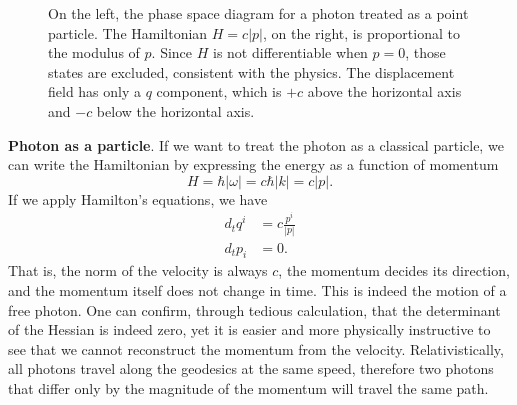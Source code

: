 \begin{figure}
	\centering
	\caption {On the left, the phase space diagram for a photon treated as a point particle. The Hamiltonian $H=c|p|$, on the right, is proportional to the modulus of $p$. Since $H$ is not differentiable when $p=0$, those states are excluded, consistent with the physics. The displacement field has only a $q$ component, which is $+c$ above the horizontal axis and $-c$ below the horizontal axis. }
\end{figure}

\textbf{Photon as a particle}. If we want to treat the photon as a classical particle, we can write the Hamiltonian by expressing the energy as a function of momentum
\begin{equation}
	H=\hbar | \omega| = c \hbar |k| = c |p|.
\end{equation}
If we apply Hamilton's equations, we have
\begin{equation}
	\begin{aligned}
		d_t q^i &= c \frac{p^i}{|p|} \\
		d_t p_i &= 0.
	\end{aligned}
\end{equation}
That is, the norm of the velocity is always $c$, the momentum decides its direction, and the momentum itself does not change in time. This is indeed the motion of a free photon. One can confirm, through tedious calculation, that the determinant of the Hessian is indeed zero, yet it is easier and more physically instructive to see that we cannot reconstruct the momentum from the velocity. Relativistically, all photons travel along the geodesics at the same speed, therefore two photons that differ only by the magnitude of the momentum will travel the same path.

